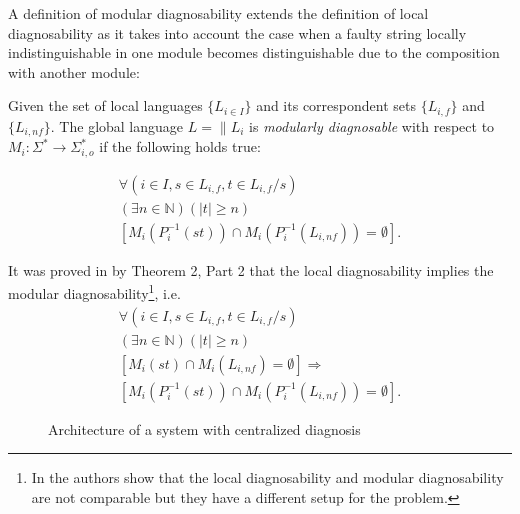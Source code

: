 \documentclass[a4paper, 10pt, conference]{ieeeconf}
\begin{document}
A definition of modular diagnosability extends the definition of local
diagnosability as it takes into account the case when a faulty string locally
indistinguishable in one module becomes distinguishable due to the
composition with another module:

\begin{definition} Given the set of local languages
$\{L_{i \in I}\}$ and its correspondent sets $\{L_{i,f}\}$ and
$\{L_{i,nf}\}$. The global language $L = \parallel L_i$ is \emph{modularly
diagnosable} with respect to
$M_i: \Sigma^* \rightarrow \Sigma_{i,o}^*$ 
if the following holds true:
\end{definition}
\begin{equation}
\begin{array}{l}
	\forall(i \in I, s \in L_{i,f}, t \in L_{i,f}/s)
	\\
	(\exists n \in \mathbb{N})
	(|t| \geq n)
	\\
	\left[ M_i(P_i^{-1}(st)) \cap M_i(P_i^{-1}(L_{i,nf})) = \emptyset \right].
\end{array}
\end{equation}

It was proved in \cite{contant_diagnosability_2006} by Theorem 2, Part 2 
that the local diagnosability implies the modular diagnosability\footnote{In
\cite{zhou_decentralized_2008} the authors show that the local diagnosability
and modular diagnosability are not comparable but they have a different setup
for the problem.}, i.e.
\begin{equation}
\begin{array}{l}
	\forall(i \in I, s \in L_{i,f}, t \in L_{i,f}/s)
	\\
	(\exists n \in \mathbb{N})
	(|t| \geq n)
	\\
	\left[ M_i(st) \cap M_i(L_{i,nf}) = \emptyset \right]
	\Rightarrow 
	\\ 
	\left[ M_i(P_i^{-1}(st)) \cap M_i(P_i^{-1}(L_{i,nf})) = \emptyset \right].
\end{array}
\end{equation}

\begin{figure}[t]
\centering
{}
\caption{Architecture of a system with centralized diagnosis}
\label{fig_centralized}
\end{figure}
\end{document}
